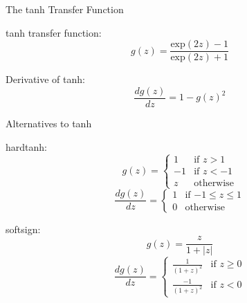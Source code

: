 \begin{frame}{The tanh Transfer Function}
\begin{block}{tanh transfer function:}
\[ g(z) = \frac {\textrm{exp}(2z) - 1}{\textrm{exp}(2z) + 1} \]
\end{block}

\pause
\begin{block}{Derivative of tanh:}
\[ \frac{d g(z)}{dz} = 1 - g(z)^2 \]
\end{block}

\end{frame}

\begin{frame}{Alternatives to tanh}

\begin{alertblock}{hardtanh:}
\[ g(z) = \left\{ \begin{array}{cc}
 	1 & \textrm{if $z > 1$} \\
 	-1 & \textrm{if $z < -1$} \\
 	z & \textrm{otherwise}
 \end{array}
 \right.
\]
\[ \frac{d g(z)}{dz} = \left\{ \begin{array}{cc}
 	1 & \textrm{if $-1 \leq z \leq 1$} \\
 	0 & \textrm{otherwise}
 \end{array}
 \right. \]
\end{alertblock}

\pause

\begin{alertblock}{softsign:}
\[ g(z) = \frac{z}{1 + |z|} \]
\[ \frac{d g(z)}{dz} = \left\{ \begin{array}{cc}
 	\frac{1}{(1 + z)^2} & \textrm{if $z \geq 0$} \\
 	\frac{-1}{(1 + z)^2} & \textrm{if $z < 0$}
 \end{array}
 \right. \]
\end{alertblock}
\end{frame}


